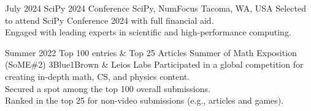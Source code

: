 \documentclass[]{report}
\begin{document}

\entry
    {July 2024}
    {SciPy 2024 Conference}  
    {SciPy, NumFocus}
    {Tacoma, WA, USA}
    {
        \tb Selected to attend SciPy Conference 2024 with full financial aid.\\
        \tb Engaged with leading experts in scientific and high-performance computing.
    }

\entry
    {Summer 2022}
    {Top 100 entries \& Top 25 Articles}
    {Summer of Math Exposition (SoME\#2)}
    {3Blue1Brown \& Leios Labs}  
    {
        \tb Participated in a global competition for creating in-depth math, CS, and physics content.\\
        \tb Secured a spot among the top 100 overall submissions.\\
        \tb Ranked in the top 25 for non-video submissions (e.g., articles and games).
    }



\end{document}
